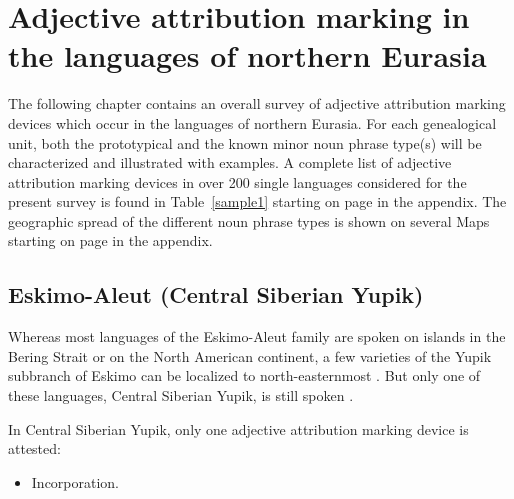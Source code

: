 
\chapter[The languages of northern Eurasia]{Adjective attribution marking in the languages of northern Eurasia}

The following chapter contains an overall survey of adjective attribution marking devices which occur in the languages of northern Eurasia. For each genealogical unit, both the prototypical and the known minor noun phrase type(s) will be characterized and illustrated with examples. A complete list of adjective attribution marking devices in over 200 single languages considered for the present survey is found in Table~\ref{sample1} starting on page \pageref{sample1} in the appendix. The geographic spread of the different noun phrase types is shown on several Maps starting on page \pageref{WorldMap} in the appendix.

\section{Eskimo-Aleut (Central Siberian Yupik)}
Whereas most languages of the Eskimo-Aleut family are spoken on islands in the Bering Strait or on the North American continent, a few varieties of the Yupik subbranch of Eskimo can be localized to north-easternmost . But only one of these languages, Central Siberian Yupik, is still spoken \cite[224]{salminen2007}.

In Central Siberian Yupik, only one adjective attribution marking device is attested:
\begin{itemize}
\item Incorporation.
\end{itemize}


